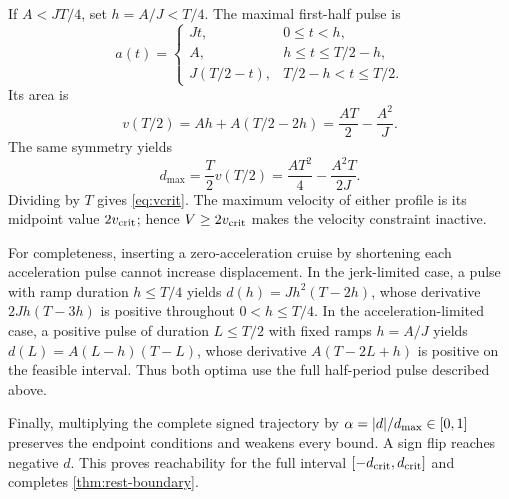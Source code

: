 If $A<JT/4$, set $h=A/J<T/4$. The maximal first-half pulse is
\begin{equation}
 a(t)=
 \begin{cases}
 Jt,&0\le t<h,\\
 A,&h\le t\le T/2-h,\\
 J(T/2-t),&T/2-h<t\le T/2.
 \end{cases}
 \label{eq:trapezoidal-acceleration}
\end{equation}
Its area is
\begin{equation}
 v(T/2)=Ah+A(T/2-2h)=\frac{AT}{2}-\frac{A^2}{J}.
\end{equation}
The same symmetry yields
\begin{equation}
 d_{\max}=\frac{T}{2}v(T/2)=\frac{AT^2}{4}-\frac{A^2T}{2J}.
\end{equation}
Dividing by $T$ gives \cref{eq:vcrit}. The maximum velocity of either profile is its midpoint value $2v_{\mathrm{crit}}$; hence $V\ge2v_{\mathrm{crit}}$ makes the velocity constraint inactive.

For completeness, inserting a zero-acceleration cruise by shortening each acceleration pulse cannot increase displacement. In the jerk-limited case, a pulse with ramp duration $h\le T/4$ yields $d(h)=Jh^2(T-2h)$, whose derivative $2Jh(T-3h)$ is positive throughout $0<h\le T/4$. In the acceleration-limited case, a positive pulse of duration $L\le T/2$ with fixed ramps $h=A/J$ yields $d(L)=A(L-h)(T-L)$, whose derivative $A(T-2L+h)$ is positive on the feasible interval. Thus both optima use the full half-period pulse described above.

Finally, multiplying the complete signed trajectory by $\alpha=\lvert d\rvert/d_{\max}\in[0,1]$ preserves the endpoint conditions and weakens every bound. A sign flip reaches negative $d$. This proves reachability for the full interval $[-d_{\mathrm{crit}},d_{\mathrm{crit}}]$ and completes \cref{thm:rest-boundary}.


